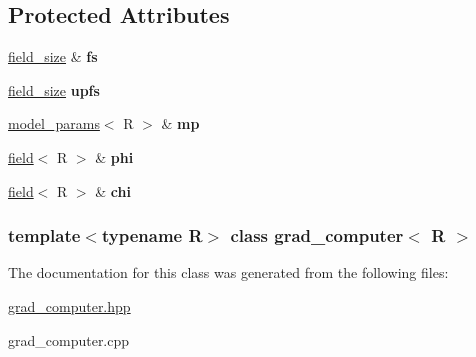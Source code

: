 \subsection*{Protected Attributes}
\begin{DoxyCompactItemize}
\item 
\hypertarget{classgrad__computer_a02be914ad46bdf588a0cf5b8f54f3860}{
\hyperlink{structfield__size}{field\_\-size} \& {\bfseries fs}}
\label{classgrad__computer_a02be914ad46bdf588a0cf5b8f54f3860}

\item 
\hypertarget{classgrad__computer_a60e6d8a2546948edecc1abe8f9b4ae57}{
\hyperlink{structfield__size}{field\_\-size} {\bfseries upfs}}
\label{classgrad__computer_a60e6d8a2546948edecc1abe8f9b4ae57}

\item 
\hypertarget{classgrad__computer_afe05111f537cc7e39c0f5d7bd7fdb1d5}{
\hyperlink{structmodel__params}{model\_\-params}$<$ R $>$ \& {\bfseries mp}}
\label{classgrad__computer_afe05111f537cc7e39c0f5d7bd7fdb1d5}

\item 
\hypertarget{classgrad__computer_aadfbdace899f83dddc6cebcf9c783e20}{
\hyperlink{classfield}{field}$<$ R $>$ \& {\bfseries phi}}
\label{classgrad__computer_aadfbdace899f83dddc6cebcf9c783e20}

\item 
\hypertarget{classgrad__computer_a4374d2769270673dd022cf47eb4e59e9}{
\hyperlink{classfield}{field}$<$ R $>$ \& {\bfseries chi}}
\label{classgrad__computer_a4374d2769270673dd022cf47eb4e59e9}

\end{DoxyCompactItemize}
\subsubsection*{template$<$typename R$>$ class grad\_\-computer$<$ R $>$}



The documentation for this class was generated from the following files:\begin{DoxyCompactItemize}
\item 
\hyperlink{grad__computer_8hpp}{grad\_\-computer.hpp}\item 
grad\_\-computer.cpp\end{DoxyCompactItemize}

